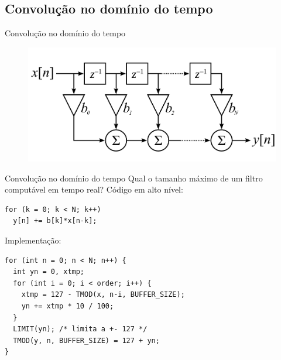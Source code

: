 %                                                       

\subsection{Convolução no domínio do tempo}

\begin{frame}{Convolução no domínio do tempo}
\begin{figure}
\includegraphics[width=\textwidth]{./img/FIR_Filter.pdf}
\end{figure}
\end{frame}

\begin{frame}[fragile]{Convolução no domínio do tempo}
{Qual o tamanho máximo de um filtro computável em tempo real?}
Código em alto nível:
\begin{lstlisting}
for (k = 0; k < N; k++)
  y[n] += b[k]*x[n-k];
\end{lstlisting}
Implementação:
\begin{lstlisting}
for (int n = 0; n < N; n++) {
  int yn = 0, xtmp;
  for (int i = 0; i < order; i++) {
    xtmp = 127 - TMOD(x, n-i, BUFFER_SIZE);
    yn += xtmp * 10 / 100;
  }
  LIMIT(yn); /* limita a +- 127 */
  TMOD(y, n, BUFFER_SIZE) = 127 + yn;
}
\end{lstlisting}
\end{frame}

